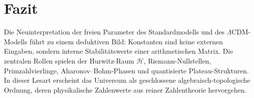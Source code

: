 \documentclass[11pt,a4paper]{article}
\begin{document}
\section{Fazit}

Die Neuinterpretation der freien Parameter des Standardmodells und des
$\Lambda\mathrm{CDM}$-Modells führt zu einem deduktiven Bild: Konstanten sind keine
externen Eingaben, sondern interne Stabilitätswerte einer arithmetischen Matrix. Die
zentralen Rollen spielen der Hurwitz-Raum $\mathcal{H}$, Riemann-Nullstellen,
Primzahlvierlinge, Aharonov--Bohm-Phasen und quantisierte Plateau-Strukturen. In dieser
Lesart erscheint das Universum als geschlossene algebraisch-topologische Ordnung, deren
physikalische Zahlenwerte aus reiner Zahlentheorie hervorgehen.
\end{document}

